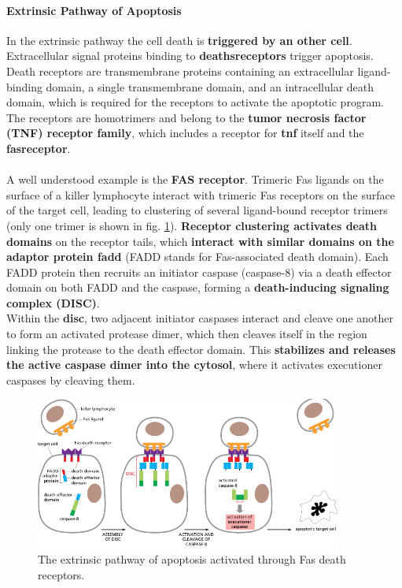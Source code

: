 \documentclass[../main.tex]{subfiles}
\begin{document}
\paragraph{Extrinsic Pathway of Apoptosis}

In the extrinsic pathway the cell death is \textbf{triggered by an other cell}. Extracellular signal proteins binding to \textbf{\gls{deathsreceptors}} trigger apoptosis. Death receptors are transmembrane proteins containing an extracellular ligand-binding domain, a single transmembrane domain, and an intracellular death domain, which is required for the receptors to activate the apoptotic program. The receptors are homotrimers and belong to 
the \textbf{tumor necrosis factor (TNF) receptor family}, which includes a receptor for \textbf{\gls{tnf}} itself and the \textbf{\gls{fasreceptor}}.\\
\\
\indent A well understood example is the \textbf{FAS receptor}. Trimeric Fas ligands on the surface of a killer lymphocyte interact with trimeric Fas receptors on the surface of the 
target cell, leading to clustering of several ligand-bound receptor trimers (only one 
trimer is shown in fig. \ref{Fas-shit}). \textbf{Receptor clustering activates death domains} on the receptor tails, which \textbf{interact with similar domains on the adaptor protein \gls{fadd}} (FADD stands for Fas-associated death domain). Each FADD protein then recruits an initiator caspase (caspase-8) via a death effector domain on both FADD and the caspase, forming a \textbf{death-inducing signaling complex (DISC)}. \\
\indent Within the \textbf{\gls{disc}}, two adjacent initiator caspases interact and cleave one another to form an activated protease dimer, which then cleaves itself in the region linking the protease to the death effector domain. This \textbf{stabilizes and releases the active caspase dimer into the cytosol}, where it activates executioner caspases by cleaving them.

\begin{figure}[H]
	\centering
	\includegraphics[width = 0.9\textwidth]{7}
	\caption{The extrinsic pathway of apoptosis activated through Fas death receptors.}
	\label{Fas-shit}
\end{figure}
\end{document}
